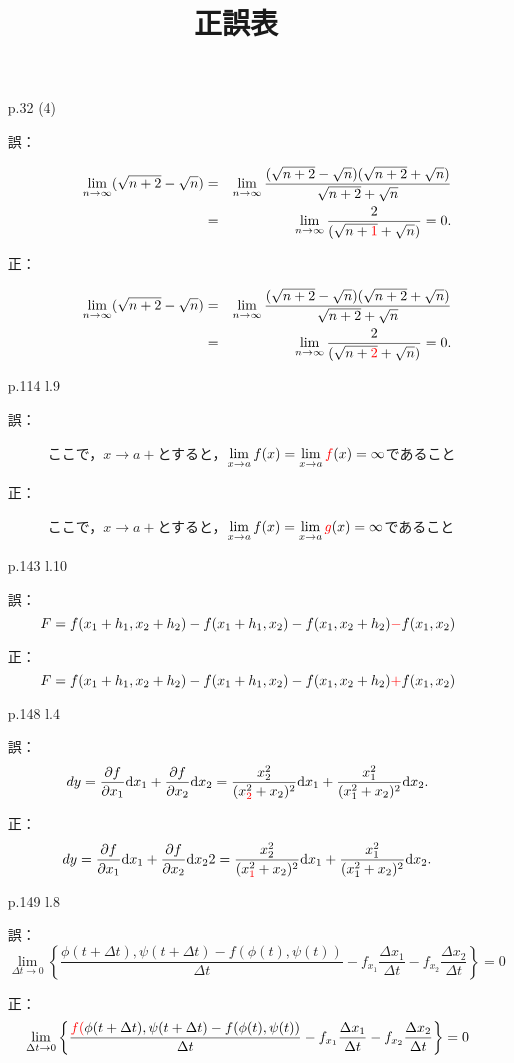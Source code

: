 \documentclass[pdflatex,ja=standard,a4paper]{bxjsarticle}
\title{正誤表}
\author{}
\newcommand{\dif}{\mathrm{d}}
\begin{document}
\maketitle


\begin{enumerate}
\item[p.32 (4)]\quad 
\begin{description}
\item[誤：] 
\begin{eqnarray*}
			\lim_{n\to\infty}(\sqrt{n+2}-\sqrt{n})
			&=& \lim_{n\to\infty}
			\frac{(\sqrt{n+2}-\sqrt{n})(\sqrt{n+2}+\sqrt{n})}{\sqrt{n+2}+\sqrt{n}}\\
			&=& \lim_{n\to\infty}
			\frac{2}{(\sqrt{n+\textcolor{red}{1}}+\sqrt{n})}=0.
\end{eqnarray*}
\item[正：] 
\begin{eqnarray*}
			\lim_{n\to\infty}(\sqrt{n+2}-\sqrt{n})
			&=& \lim_{n\to\infty}
			\frac{(\sqrt{n+2}-\sqrt{n})(\sqrt{n+2}+\sqrt{n})}{\sqrt{n+2}+\sqrt{n}}\\
		&=& \lim_{n\to\infty}
		\frac{2}{(\sqrt{n+\textcolor{red}{2}}+\sqrt{n})}=0.
\end{eqnarray*}
\end{description}
\item[p.114 l.9]\quad 
\begin{description}
\item[誤：] 
ここで，$x\to a+$とすると，${\displaystyle\lim_{x\to a}f(x)=\lim_{x\to a}\textcolor{red}{f}(x)=\infty}$であること
\item[正：] 
ここで，$x\to a+$とすると，${\displaystyle\lim_{x\to a}f(x)=\lim_{x\to a}\textcolor{red}{g}(x)=\infty}$であること
\end{description}
\item[p.143 l.10]
\item[誤：] 
$$F=f(x_1+h_1,x_2+h_2)-f(x_1+h_1,x_2)-f(x_1,x_2+h_2)\textcolor{red}{-}f(x_1,x_2)$$
\item[正：] 
$$F=f(x_1+h_1,x_2+h_2)-f(x_1+h_1,x_2)-f(x_1,x_2+h_2)\textcolor{red}{+}f(x_1,x_2)$$

\item[p.148 l.4]
\item[誤：] 
$$dy=\frac{\partial f}{\partial x_1}\dif x_1+\frac{\partial f}{\partial x_2}\dif x_2=
\frac{x_2^2}{(x_{\textcolor{red}{2}}^2+x_2)^2}\dif x_1+
\frac{x_1^2}{(x_1^2+x_2)^2}\dif x_2.$$
\item[正：] 
$$dy=\frac{\partial f}{\partial x_1}\dif x_1+\frac{\partial f}{\partial x_2}\dif x_2
2=
\frac{x_2^2}{(x_{\textcolor{red}{1}}^2+x_2)^2}\dif x_1+
\frac{x_1^2}{(x_1^2+x_2)^2}\dif x_2.$$
\item[p.149 l.8]
\item[誤：] 
$$\lim_{\Delta t\to0}
\left\{
\frac{\phi(t+\Delta t),\psi(t+\Delta t)-f(\phi(t),\psi(t))}{\Delta t}-f_{x_1}\frac{\Delta x_1}{\Delta t}-f_{x_2}\frac{\Delta x_2}{\Delta t}
\right\}=0$$
\item[正：] 
$$\lim_{\Delta t\to0}
\left\{
\frac{\textcolor{red}{f(}\phi(t+\Delta t),\psi(t+\Delta t)-f(\phi(t),\psi(t))}{\Delta t}-f_{x_1}\frac{\Delta x_1}{\Delta t}-f_{x_2}\frac{\Delta x_2}{\Delta t}
\right\}=0$$
\end{enumerate}
\end{document}
